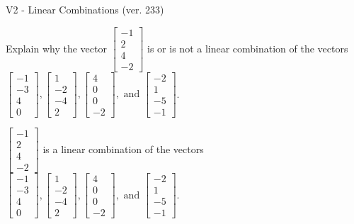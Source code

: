 \begin{exercise}
  \begin{exerciseTitle}V2 - Linear Combinations (ver. 233)\end{exerciseTitle}
  \begin{exerciseStatement}
    Explain why the vector \(\left[\begin{array}{c}
-1 \\
2 \\
4 \\
-2
\end{array}\right]\)  is or is not a linear 
	combination of the vectors \(\left[\begin{array}{c}
-1 \\
-3 \\
4 \\
0
\end{array}\right] , \left[\begin{array}{c}
1 \\
-2 \\
-4 \\
2
\end{array}\right] , \left[\begin{array}{c}
4 \\
0 \\
0 \\
-2
\end{array}\right] , \text{ and } \left[\begin{array}{c}
-2 \\
1 \\
-5 \\
-1
\end{array}\right]\).
	


  \end{exerciseStatement}
  \begin{exerciseAnswer}
   \(\left[\begin{array}{c}
-1 \\
2 \\
4 \\
-2
\end{array}\right]\) 
  	 is  
	a linear combination of the vectors \(\left[\begin{array}{c}
-1 \\
-3 \\
4 \\
0
\end{array}\right] , \left[\begin{array}{c}
1 \\
-2 \\
-4 \\
2
\end{array}\right] , \left[\begin{array}{c}
4 \\
0 \\
0 \\
-2
\end{array}\right] , \text{ and } \left[\begin{array}{c}
-2 \\
1 \\
-5 \\
-1
\end{array}\right]\).


\end{exerciseAnswer}
\end{exercise}
